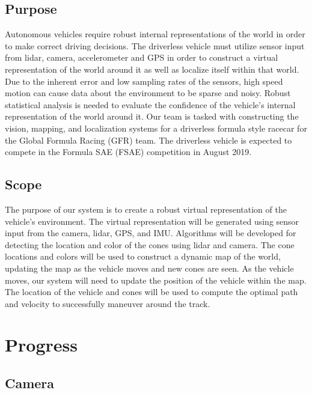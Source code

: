 \documentclass[10pt, onecolumn, draftclsnofoot, letterpaper,compsoc]{IEEEtran}
\begin{document}
\subsection{Purpose}
Autonomous vehicles require robust internal representations of the world in order to make correct driving decisions. The driverless vehicle must utilize sensor input from lidar, camera, accelerometer and GPS in order to construct a virtual representation of the world around it as well as localize itself within that world. Due to the inherent error and low sampling rates of the sensors, high speed motion can cause data about the environment to be sparse and noisy. Robust statistical analysis is needed to evaluate the confidence of the vehicle's internal representation of the world around it. Our team is tasked with constructing the vision, mapping, and localization systems for a driverless formula style racecar for the Global Formula Racing (GFR) team. The driverless vehicle is expected to compete in the Formula SAE (FSAE) competition in August 2019. 

\subsection{Scope}
The purpose of our system is to create a robust virtual representation of the vehicle's environment. The virtual representation will be generated using sensor input from the camera, lidar, GPS, and IMU. Algorithms will be developed for detecting the location and color of the cones using lidar and camera. The cone locations and colors will be used to construct a dynamic map of the world, updating the map as the vehicle moves and new cones are seen. As the vehicle moves, our system will need to update the position of the vehicle within the map. The location of the vehicle and cones will be used to compute the optimal path and velocity to successfully maneuver around the track.

\section{Progress}
\subsection{Camera}
\end{document}
